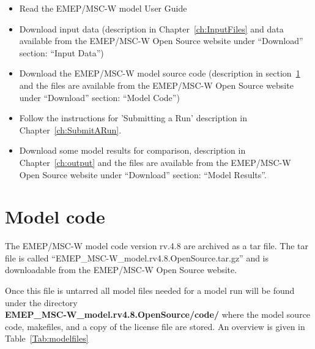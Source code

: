 \begin{itemize}
\item Read the EMEP/MSC-W model User Guide
\item
Download input data (description in Chapter~\ref{ch:InputFiles} and
data available from the EMEP/MSC-W Open Source website under ``Download''
section: ``Input Data'')
\item
Download the EMEP/MSC-W model source code (description in 
section~\ref{sec:ModelCode} and the files are available from the EMEP/MSC-W 
Open Source website under ``Download'' section: ``Model Code'')
\item
Follow the instructions for 'Submitting a Run' description in
Chapter~\ref{ch:SubmitARun}.
\item
Download some model results for comparison, description in
Chapter~\ref{ch:output} and the files are available from the EMEP/MSC-W 
Open Source website under ``Download'' section: ``Model Results''. 


\end{itemize}

\section{Model code}
\label{sec:ModelCode}

The EMEP/MSC-W model code version rv.4.8 are archived as a tar file. 
The tar file is called ``EMEP\_MSC-W\_model.rv4.8.OpenSource.tar.gz'' and 
is downloadable from the EMEP/MSC-W Open Source website.

Once this file is untarred all model files needed for a model run will be 
found under the directory \\ {\bf EMEP\_MSC-W\_model.rv4.8.OpenSource/code/} 
where the model source code, makefiles, and a copy of the license file are 
stored. An overview is given in Table~\ref{Tab:modelfiles}

